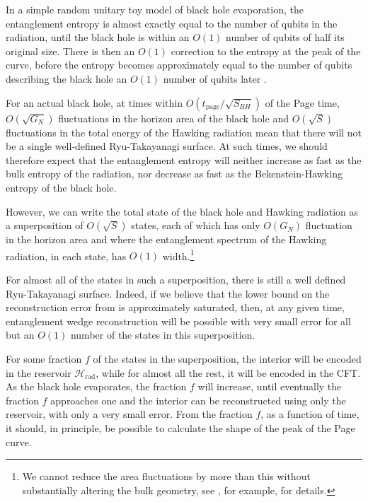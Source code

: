 \documentclass[12pt]{article}
\begin{document}
In a simple random unitary toy model of black hole evaporation, the entanglement entropy is almost exactly equal to the number of qubits in the radiation, until the black hole is within an $O(1)$ number of qubits of half its original size. There is then an $O(1)$ correction to the entropy at the peak of the curve, before the entropy becomes approximately equal to the number of qubits describing the black hole an $O(1)$ number of qubits later \cite{page1993average}.

For an actual black hole, at times within $O(t_\text{page}/\sqrt{S_{BH}})$ of the Page time, $O(\sqrt{G_N})$ fluctuations in the horizon area of the black hole and $O(\sqrt{S})$ fluctuations in the total energy of the Hawking radiation mean that there will not be a single well-defined Ryu-Takayanagi surface. At such times, we should therefore expect that the entanglement entropy will neither increase as fast as the bulk entropy of the radiation, nor decrease as fast as the Bekenstein-Hawking entropy of the black hole. 

However, we can write the total state of the black hole and Hawking radiation as a superposition of $O(\sqrt{S})$ states, each of which has only $O(G_N)$ fluctuation in the horizon area and where the entanglement spectrum of the Hawking radiation, in each state, has $O(1)$ width.\footnote{We cannot reduce the area fluctuations by more than this without substantially altering the bulk geometry, see \cite{bao2018beyond, bao2019holographic}, for example, for details.}  

For almost all of the states in such a superposition, there is still a well defined Ryu-Takayanagi surface. Indeed, if we believe that the lower bound on the reconstruction error from \cite{hayden2018learning} is approximately saturated, then, at any given time, entanglement wedge reconstruction will be possible with very small error for all but an $O(1)$ number of the states in this superposition. 

For some fraction $f$ of the states in the superposition, the interior will be encoded in the reservoir $\mathcal{H}_\text{rad}$, while for almost all the rest, it will be encoded in the CFT. As the black hole evaporates, the fraction $f$ will increase, until eventually the fraction $f$ approaches one and the interior can be reconstructed using only the reservoir, with only a very small error. From the fraction $f$, as a function of time, it should, in principle, be possible to calculate the shape of the peak of the Page curve.
\end{document}
